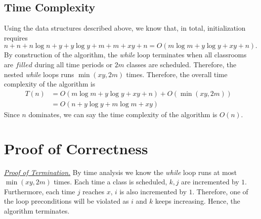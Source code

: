 \documentclass[11pt, oneside]{article}   	%
\begin{document}
\subsection{Time Complexity}
Using the data structures described above, we know that, in total, initialization requires \[n+n+n\log n+y+y\log y+m+m+xy+n = O(m\log m+y\log y +xy+n).\] By construction of the algorithm, the {\it while} loop terminates when all classrooms are $filled$ during all time periods or $2m$ classes are scheduled. Therefore, the nested {\it while} loops runs $\min(xy, 2m)$ times. Therefore, the overall time complexity of the algorithm is 
\begin{align*}
T(n) &= O(m\log m+y\log y +xy+n)+O(\min(xy, 2m))\\
& = O(n+y\log y+m\log m +xy)
\end{align*}
Since $n$ dominates, we can say the time complexity of the algorithm is $O(n)$.

\section{Proof of Correctness}
\underline{\textit{Proof of Termination.}} By time analysis we know the {\it while} loop runs at most $\min(xy, 2m)$ times. Each time a class is scheduled, $k, j$ are incremented by $1$. Furthermore, each time $j$ reaches $x$, $i$ is also incremented by $1$. Therefore, one of the loop preconditions will be violated as $i$ and $k$ keeps increasing. Hence, the algorithm terminates.
\end{document}
